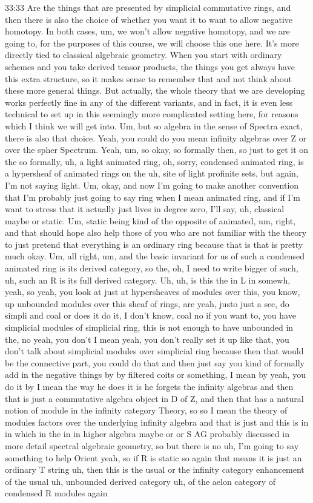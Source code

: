 \begin{unfinished}{33:33}
Are the things that are presented by simplicial commutative rings, and then there is also the choice of whether you want it to want to allow negative homotopy. In both cases, um, we won't allow negative homotopy, and we are going to, for the purposes of this course, we will choose this one here. It's more directly tied to classical algebraic geometry. When you start with ordinary schemes and you take derived tensor products, the things you get always have this extra structure, so it makes sense to remember that and not think about these more general things. But actually, the whole theory that we are developing works perfectly fine in any of the different variants, and in fact, it is even less technical to set up in this seemingly more complicated setting here, for reasons which I think we will get into. Um, but so algebra in the sense of Spectra exact, there is also that choice. Yeah, you could do you mean infinity algebras over Z or over the spher Spectrum. Yeah, um, so okay, so formally then, so just to get it on the so formally, uh, a light animated ring, oh, sorry, condensed animated ring, is a hypersheaf of animated rings on the uh, site of light profinite sets, but again, I'm not saying light. Um, okay, and now I'm going to make another convention that I'm probably just going to say ring when I mean animated ring, and if I'm want to stress that it actually just lives in degree zero, I'll say, uh, classical maybe or static. Um, static being kind of the opposite of animated, um, right, and that should hope also help those of you who are not familiar with the theory to just pretend that everything is an ordinary ring because that is that is pretty much okay. Um, all right, um, and the basic invariant for us of such a condensed animated ring is its derived category, so the, oh, I need to write bigger of such, uh, such an R is its full derived category. Uh, uh, is this the in L in somewh, yeah, so yeah, you look at just at hypersheaves of modules over this, you know, up unbounded modules over this sheaf of rings, are yeah, justo just a sec, do simpli and coal or does it do it, I don't know, coal no if you want to, you have simplicial modules of simplicial ring, this is not enough to have unbounded in the, no yeah, you don't I mean yeah, you don't really set it up like that, you don't talk about simplicial modules over simplicial ring because then that would be the connective part, you could do that and then just say you kind of formally add in the negative things by by filtered coits or something, I mean by yeah, you do it by I mean the way he does it is he forgets the infinity algebras and then that is just a commutative algebra object in D of Z, and then that has a natural notion of module in the infinity category Theory, so so I mean the theory of modules factors over the underlying infinity algebra and that is just and this is in in which in the in in higher algebra maybe or or S AG probably discussed in more detail spectral algebraic geometry, so but there is no uh, I'm going to say something to help Orient yeah, so if R is static so again that means it is just an ordinary T string uh, then this is the usual or the infinity category enhancement of the usual uh, unbounded derived category uh, of the aelon category of condensed R modules again 
\end{unfinished}
